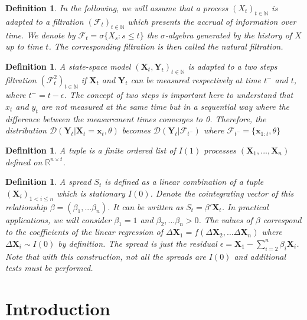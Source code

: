 \documentclass[11pt,a4,twosided,singlespacing,titlepagenumber=on]{scrreprt}
\numberwithin{equation}{chapter} %
\newtheorem{definition}[theorem]{Definition}%
\theoremstyle{remark}
\newcommand{\matr}[1]{\mathbf{#1}}
\begin{document}
\begin{definition}
In the following, we will assume that a process $(X_t)_{t \in \mathbb{N}}$ is adapted to a filtration $(\mathcal{F}_t)_{t \in \mathbb{N}}$ which presents the accrual of information over time. We denote by $\mathcal{F}_t = \sigma \{X_s : s \leq t \}$ the $\sigma$-algebra generated by the history of $X$ up to time $t$. The corresponding filtration is then called the natural filtration.
\end{definition}

\begin{definition}
A state-space model $(\matr{X}_t, \matr{Y}_t)_{t \in \mathbb{N}}$ is adapted to a two steps filtration $(\mathcal{F}^2_t)_{t \in \mathbb{N}}$ if $\matr{X}_t$ and $\matr{Y}_t$ can be measured respectively at time $t^-$ and $t$, where $t^- = t - \epsilon$. The concept of two steps is important here to understand that $x_t$ and $y_t$ are not measured at the same time but in a sequential way where the difference between the measurement times converges to 0. Therefore, the distribution $\mathcal{D}(\matr{Y}_t | \matr{X}_t = \matr{x}_t, \theta)$ becomes $\mathcal{D}(\matr{Y}_t | \mathcal{F}_{t^-})$ where $\mathcal{F}_{t^-} = \{\matr{x}_{1:t}, \theta \}$
\end{definition}

\begin{definition}
A tuple is a finite ordered list of $I(1)$ processes $(\matr{X}_1, ..., \matr{X}_n)$ defined on $\mathbb{R}^{n \times t}$. \label{definition_tuple}
\end{definition}

\begin{definition}
\label{spread_def}
A spread $S_t$ is defined as a linear combination of a tuple $(\matr{X}_i)_{1 < i \leq n}$ which is stationary $I(0)$. Denote the cointegrating vector of this relationship $\beta = (\beta_1,...\beta_n)$. It can be written as $S_t = \beta' \matr{X}_t$. In practical applications, we will consider $\beta_1 = 1$ and $\beta_2,...\beta_n > 0$. The values of $\beta$ correspond to the coefficients of the linear regression of $\Delta \matr{X}_1 = f(\Delta \matr{X}_2,...\Delta \matr{X}_n)$ where $\Delta \matr{X}_i \sim I(0)$ by definition. The spread is just the residual $\epsilon = \matr{X}_1 - \sum_{i=2}^n \beta_i \matr{X}_i$. Note that with this construction, not all the spreads are $I(0)$ and additional tests must be performed.
\end{definition}

\chapter{Introduction}
\end{document}
